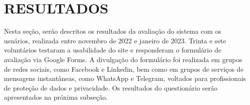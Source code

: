 \documentclass[
	12pt,				%
	openright,			%
	oneside,			%
	a4paper,			%
	english,			%
	french,				%
	spanish,			%
	brazil,				%
	]{abntex2}
\begin{document}
\pagebreak


\chapter{RESULTADOS}
\label{ch: resultados} 

Nesta seção, serão descritos os resultados da avaliação do sistema com os usuários, realizada entre novembro de 2022 e janeiro de 2023. Trinta e sete voluntários testaram a usabilidade do site e responderam o formulário de avaliação via Google Forms. A divulgação do formulário foi realizada em grupos de redes sociais, como Facebook e Linkedin, bem como em grupos de serviços de mensagens instantâneas, como WhatsApp e Telegram, voltados para profissionais de proteção de dados e privacidade. Os resultados do questionário serão apresentados na próxima subseção.
\end{document}
